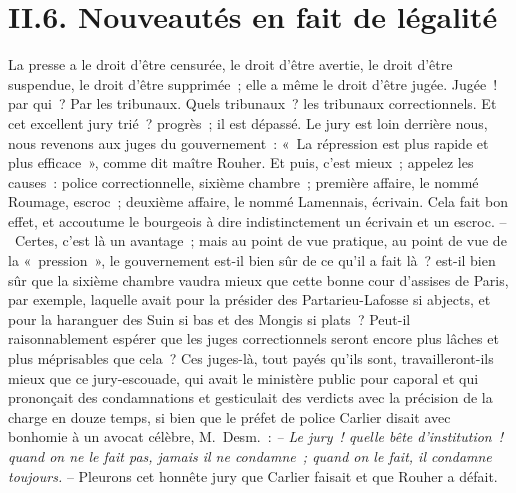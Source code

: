\documentclass[french,twoside]{book} %
\begin{document}
\section[{II.6. Nouveautés en fait de légalité}]{II.6. Nouveautés en fait de légalité}

\noindent La presse a le droit d’être censurée, le droit d’être avertie, le droit d’être suspendue, le droit d’être supprimée ; elle a même le droit d’être jugée. Jugée ! par qui ? Par les tribunaux. Quels tribunaux ? les tribunaux correctionnels. Et cet excellent jury trié ? progrès ; il est dépassé. Le jury est loin derrière nous, nous revenons aux juges du gouvernement : « La répression est plus rapide et plus efficace », comme dit maître Rouher. Et puis, c’est mieux ; appelez les causes : police correctionnelle, sixième chambre ; première affaire, le nommé Roumage, escroc ; deuxième affaire, le nommé Lamennais, écrivain. Cela fait bon effet, et accoutume le bourgeois à dire indistinctement un écrivain et un escroc. – Certes, c’est là un avantage ; mais au point de vue pratique, au point de vue de la « pression », le gouvernement est-il bien sûr de ce qu’il a fait là ? est-il bien sûr que la sixième chambre vaudra mieux que cette bonne cour d’assises de Paris, par exemple, laquelle avait pour la présider des Partarieu-Lafosse si abjects, et pour la haranguer des Suin si bas et des Mongis si plats ? Peut-il raisonnablement espérer que les juges correctionnels seront encore plus lâches et plus méprisables que cela ? Ces juges-là, tout payés qu’ils sont, travailleront-ils mieux que ce jury-escouade, qui avait le ministère public pour caporal et qui prononçait des condamnations et gesticulait des verdicts avec la précision de la charge en douze temps, si bien que le préfet de police Carlier disait avec bonhomie à un avocat célèbre, M. Desm. : \emph{– Le jury ! quelle bête d’institution ! quand on ne le fait pas, jamais il ne condamne ; quand on le fait, il condamne toujours.} – Pleurons cet honnête jury que Carlier faisait et que Rouher a défait.\par
\end{document}
